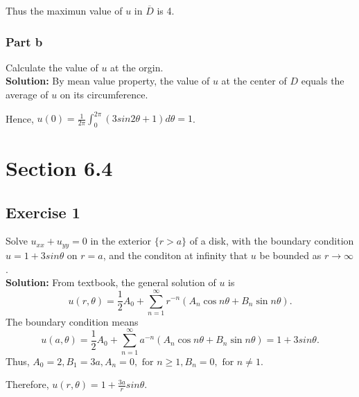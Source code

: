 \documentclass[12pt]{article}%
\begin{document}
    Thus the maximun value of $u$ in $\overline{D}$ is 4.

    \subsubsection*{Part b} Calculate the value of $u$ at the orgin.\\
    \textbf{Solution:}
    By mean value property, the value of $u$ at the center of $D$ equals the average of $u$ on its circumference.
    
    Hence, $u(0)=\frac{1}{2\pi}\int_{0}^{2\pi}(3sin 2\theta+1)d\theta=1$.


    \section*{Section 6.4}
    \subsection*{Exercise 1} Solve $u_{xx}+u_{yy}=0$ in the exterior $\{r>a\}$ of a disk, with the boundary condition $u=1+3sin \theta$ on $ r=a$, and the conditon at infinity that $u$ be bounded as $r\to \infty$.\\
    \textbf{Solution:}
        From textbook, the general solution of $u$ is \[u(r, \theta)=\frac{1}{2} A_{0}+\sum_{n=1}^{\infty} r^{-n}\left(A_{n} \cos n \theta+B_{n} \sin n \theta\right).\] 
        The boundary condition means 
        \[u(a, \theta)=\frac{1}{2} A_{0}+\sum_{n=1}^{\infty} a^{-n}\left(A_{n} \cos n \theta+B_{n} \sin n \theta\right)=1+3sin \theta.\] 
        Thus, $A_{0}=2, B_{1}=3a, A_{n}=0, \text{ for } n \ge 1, B_{n}=0, \text{ for } n \ne 1.$
        
        Therefore, $u(r, \theta)=1+\frac{3a}{r}sin\theta.$
 
\end{document}
